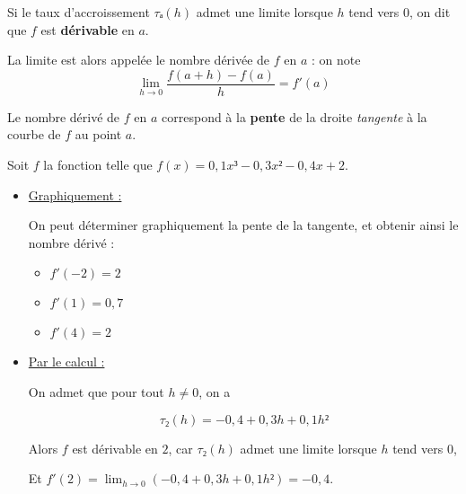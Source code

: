 \documentclass[
	classe=$1^{ere}STI2D$,
	headerTitle=Cours\space Chapitre\space 5
]{coursclass}
\begin{document}
\begin{definition}
	Si le taux d'accroissement $τₐ(h)$ admet une limite lorsque $h$ tend vers $0$, on dit que $f$ est \textbf{dérivable} en $a$.

	La limite est alors appelée le nombre dérivée de $f$ en $a$ : on note
	$$ \lim_{h→0} \dfrac{f(a+h)-f(a)}{h} = f'(a) $$
\end{definition}

\begin{remarque}
	Le nombre dérivé de $f$ en $a$ correspond à la \textbf{pente} de la droite \textit{tangente} à la courbe de $f$ au point $a$.
\end{remarque}

\begin{exemple}
	Soit $f$ la fonction telle que $f(x) = 0,1x³ - 0,3x² - 0,4x + 2$.

	\begin{itemize}
		\item \uline{Graphiquement :}

		      \begin{center}
		      \end{center}

		      On peut déterminer graphiquement la pente de la tangente, et obtenir ainsi le nombre dérivé :
		      \begin{multicols}{3}
			      \begin{itemize}
				      \item $f'(-2) = 2$
				      \item $f'(1) = 0,7$
				      \item $f'(4) = 2$
			      \end{itemize}
		      \end{multicols}
		\item \uline{Par le calcul :}

		      On admet que pour tout $h ≠ 0$, on a

		      $$ τ₂(h) = -0,4 + 0,3h + 0,1h² $$

			  Alors $f$ est dérivable en $2$, car $τ₂(h)$ admet une limite lorsque $h$ tend vers $0$,

		      Et $f'(2) = \lim_{h→0}(-0,4 + 0,3h + 0,1h²) = -0,4$.
	\end{itemize}
\end{exemple}
\end{document}
